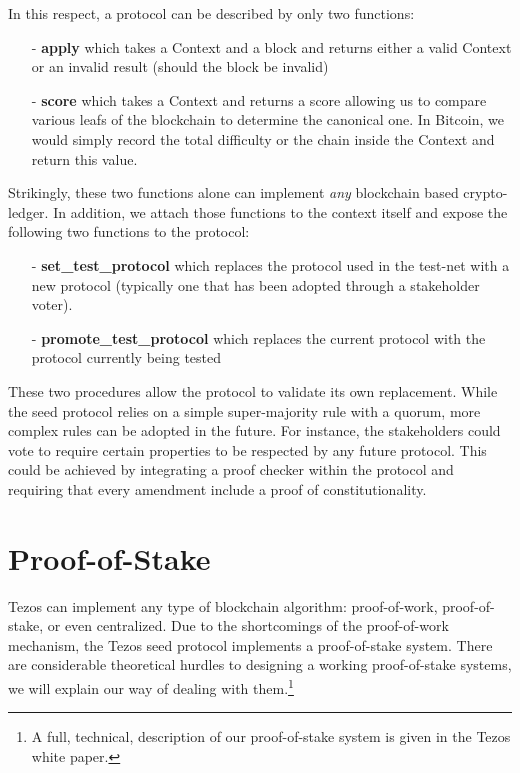 \documentclass[letterpaper]{article}
\begin{document}
In this respect, a protocol can be described by only two functions:
\begin{itemize}
\item[-] \textbf{apply} which takes a Context and a block and returns
either a valid Context or an invalid result (should the block be invalid)
\item[-] \textbf{score} which takes a Context and returns a score
allowing us to compare various leafs of the blockchain
to determine the canonical one.
In Bitcoin, we would simply record the total difficulty
or the chain inside the Context and return this value.
\end{itemize}

Strikingly, these two functions alone can implement \emph{any} blockchain based
crypto-ledger. In addition, we attach those functions to the context itself
and expose the following two functions to the protocol:

\begin{itemize}
\item[-] \textbf{set\_test\_protocol} which replaces the protocol used in the
test-net with a new protocol (typically one that has been adopted through a
stakeholder voter).
\item[-] \textbf{promote\_test\_protocol} which replaces the current protocol
with the protocol currently being tested
\end{itemize}

These two procedures allow the protocol to validate its own replacement.
While the seed protocol relies on a simple super-majority rule with a quorum,
more complex rules can be adopted in the future.
For instance, the stakeholders could vote
to require certain properties to be respected by any future protocol.
This could be achieved by integrating a proof checker within the protocol
and requiring that every amendment include a proof of constitutionality.

\section{Proof-of-Stake}
Tezos can implement any type of blockchain algorithm:
proof-of-work, proof-of-stake, or even centralized.
Due to the shortcomings of the proof-of-work mechanism,
the Tezos seed protocol implements a proof-of-stake system.
There are considerable theoretical hurdles to designing a working
proof-of-stake systems, we will explain our way of dealing with 
them.\footnote{A full, technical, description of our proof-of-stake system is
given in the Tezos white paper.}
\end{document}
